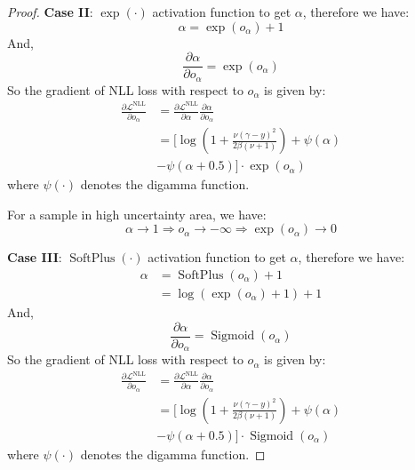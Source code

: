 \begin{proof}
\textbf{Case II}: $\operatorname{exp}(\cdot)$ activation function to get $\alpha$, therefore we have:
\begin{equation}
\alpha=\operatorname{exp}(o_{\alpha}) + 1  
\end{equation}
And,
\begin{equation}
    \frac{\partial \alpha}{\partial o_{\alpha}}=\exp(o_{\alpha})
\end{equation}
So the gradient of NLL loss with respect to $o_{\alpha}$ is given by:
\begin{equation}
\begin{aligned}
\frac{\partial \mathcal{L}^{\mathrm{NLL}}}{\partial o_\alpha} &= \frac{\partial \mathcal{L}^{\mathrm{NLL}}}{\partial \alpha} \frac{\partial \alpha}{\partial o_{\alpha}}     \\
&=[\log(1+\frac{\nu(\gamma-y)^2}{2\beta(\nu+1)}) +\psi(\alpha) \\
&- \psi(\alpha+0.5)] \cdot \exp(o_{\alpha})
\end{aligned}
\end{equation}
where $\psi(\cdot)$ denotes the digamma function.

For a sample in high uncertainty area, we have:
\begin{equation}
    \alpha \rightarrow 1 \Rightarrow o_\alpha \rightarrow-\infty \Rightarrow \exp\left(o_\alpha\right) \rightarrow 0
\end{equation}




\textbf{Case III}: $\operatorname{SoftPlus}(\cdot)$ activation function to get $\alpha$, therefore we have:
\begin{equation}
\begin{aligned}
\alpha&=\operatorname{SoftPlus}(o_{\alpha}) + 1  \\
      &= \log(\exp(o_{\alpha})+1)+1 
\end{aligned}
\end{equation}
And,
\begin{equation}
    \frac{\partial \alpha}{\partial o_{\alpha}}=\operatorname{Sigmoid}\left(o_\alpha\right)
\end{equation}
So the gradient of NLL loss with respect to $o_{\alpha}$ is given by:
\begin{equation}
\begin{aligned}
\frac{\partial \mathcal{L}^{\mathrm{NLL}}}{\partial o_\alpha} &= \frac{\partial \mathcal{L}^{\mathrm{NLL}}}{\partial \alpha} \frac{\partial \alpha}{\partial o_{\alpha}}     \\
&=[\log(1+\frac{\nu(\gamma-y)^2}{2\beta(\nu+1)}) +\psi(\alpha) \\
&- \psi(\alpha+0.5)] \cdot \operatorname{Sigmoid}\left(o_\alpha\right)
\end{aligned}
\end{equation}
where $\psi(\cdot)$ denotes the digamma function.


\end{proof}
